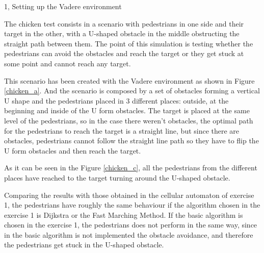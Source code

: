 \documentclass[10pt,a4paper]{article}
\begin{document}
\begin{task}{1, Setting up the Vadere environment}
\clearpage


The chicken test consists in a scenario with pedestrians in one side and their target in the other, with a U-shaped obstacle in the middle obstructing the straight path between them. The point of this simulation is testing whether the pedestrians can avoid the obstacles and reach the target or they get stuck at some point and cannot reach any target.

This scenario has been created with the Vadere environment as shown in Figure \ref{chicken_a}. And the scenario is composed by a set of obstacles forming a vertical U shape and the pedestrians placed in 3 different places: outside, at the beginning and inside of the U form obstacles. The target is placed at the same level of the pedestrians, so in the case there weren't obstacles, the optimal path for the pedestrians to reach the target is a straight line, but since there are obstacles, pedestrians cannot follow the straight line path so they have to flip the U form obstacles and then reach the target.

As it can be seen in the Figure \ref{chicken_c}, all the pedestrians from the different places have reached to the target turning around the U-shaped obstacle.

Comparing the results with those obtained in the cellular automaton of exercise 1, the pedestrians have roughly the same behaviour if the algorithm chosen in the exercise 1 is Dijkstra or the Fast Marching Method. If the basic algorithm is chosen in the exercise 1, the pedestrians does not perform in the same way, since in the basic algorithm is not implemented the obstacle avoidance, and therefore the pedestrians get stuck in the U-shaped obstacle.


\end{task}
\end{document}
